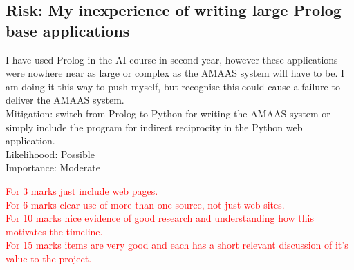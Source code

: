 \documentclass{article}
\begin{document}
\subsection*{Risk: My inexperience of writing large Prolog base applications}
I have used Prolog in the AI course in second year, however these applications were nowhere near as large or complex as the AMAAS system will have to be. I am doing it this way to push myself, but recognise this could cause a failure to deliver the AMAAS system.\\
Mitigation: switch from Prolog to Python for writing the AMAAS system or simply include the program for indirect reciprocity in the Python web application.\\
Likelihoood: Possible\\
Importance: Moderate

{}

\textcolor{red}{For 3 marks just include web pages.\\For 6 marks clear use of more than one source, not just web sites.\\For 10 marks nice evidence of good research and understanding how this motivates the timeline.\\For 15 marks items are very good and each has a short relevant discussion of it's value to the project.}
\end{document}

